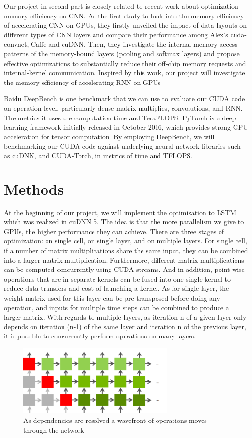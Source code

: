 \documentclass{article}
\begin{document}
 Our project in second part is closely related to recent work about optimization memory efficiency on CNN\cite{li2016optimizing}. As the first study to look into the memory efficiency of accelerating CNN on GPUs, they firstly unveiled the impact of data layouts on different types of CNN layers and compare their performance among Alex’s cuda-convnet, Caffe and cuDNN. Then, they investigate the internal memory access patterns of the memory-bound layers (pooling and softmax layers) and propose effective optimizations to substantially reduce their off-chip memory requests and internal-kernel communication. Inspired by this work, our project will investigate the memory efficiency of accelerating RNN on GPUs

Baidu DeepBench\cite{DeepBench} is one benchmark that we can use to evaluate our CUDA code on operation-level, particularly dense matrix multiplies, convolutions, and RNN. The metrics it uses are computation time and TeraFLOPS. 
PyTorch\cite{PyTorch} is a deep learning framework initially released in October 2016, which provides strong GPU acceleration for tensor computation. 
By employing DeepBench, we will benchmarking our CUDA code against underlying neural network libraries such as cuDNN, and CUDA-Torch, in metrics of time and TFLOPS.

\section{Methods}

At the beginning of our project, we will implement the optimization to LSTM which was realized in cuDNN 5\cite{appleyard2016optimizing}. The idea is that the more parallelism we give to GPUs, the higher performance they can achieve. There are three stages of optimization: on single cell, on single layer, and on multiple layers. For single cell, if a number of matrix multiplications share the same input, they can be combined into a larger matrix multiplication. Furthermore, different matrix multiplications can be computed concurrently using CUDA streams. And in addition, point-wise operations that are in separate kernels can be fused into one single kernel to reduce data transfers and cost of launching a kernel. As for single layer, the weight matrix used for this layer can be pre-transposed before doing any operation, and inputs for multiple time steps can be combined to produce a larger matrix. With regards to multiple layers, as iteration n of a given layer only depends on iteration (n-1) of the same layer and iteration n of the previous layer, it is possible to concurrently perform operations on many layers.

\begin{figure}[h]
\centering
\includegraphics[width=0.7\textwidth]{layers}
\caption{As dependencies are resolved a wavefront of operations moves through the network\cite{optimizingRNN}}
\end{figure}

\medskip



\end{document}
